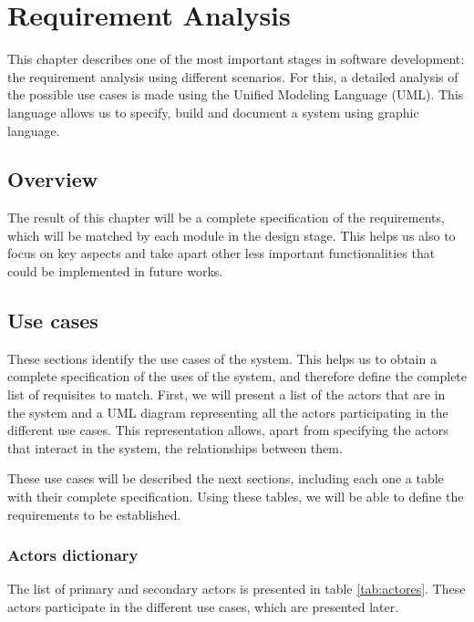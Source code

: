 \chapter{Requirement Analysis}
\label{chap:requirements}

\begin{chapterintro}
This chapter describes one of the most important stages in software development: the requirement analysis using different scenarios. For this, a detailed analysis of the possible use cases is made using the Unified Modeling Language (UML). This language allows us to specify, build and document a system using graphic language. 
\end{chapterintro}


\cleardoublepage

\section{Overview}
The result of this chapter will be a complete specification of the requirements, which will be matched by each module in the design stage. This helps us also to focus on key aspects and take apart other less important functionalities that could be implemented in future works.


\section{Use cases}

These sections identify the use cases of the system. This helps us to obtain a complete specification of the uses of the system, and therefore define the complete list of requisites to match.  First, we will present a list of the actors that are in the system and a UML diagram representing all the actors participating in the different use cases. This representation allows, apart from specifying the actors that interact in the system, the relationships between them.

These use cases will be described the next sections, including each one a table with their complete specification. Using these tables, we will be able to define the requirements to be established.


\subsection{Actors dictionary}

\noindent The list of primary and secondary actors is presented in table \ref{tab:actores}. These actors participate in the different use cases, which are presented later.\\



